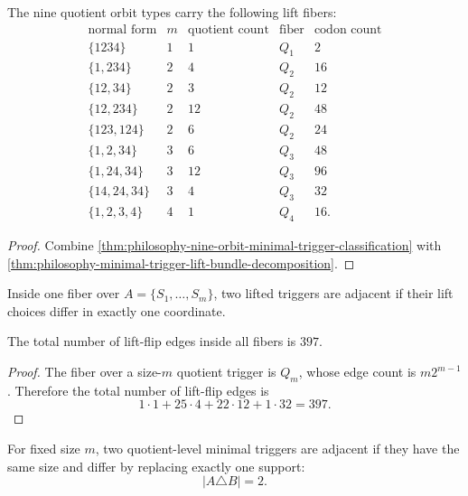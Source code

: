 \begin{corollary}
\label{cor:philosophy-minimal-trigger-orbit-fibers}
The nine quotient orbit types carry the following lift fibers:
$$
\begin{array}{c|r|r|c|r}
  \text{normal form} & m & \text{quotient count} & \text{fiber} & \text{codon count}\\
  \hline
  \{1234\} & 1 & 1 & Q_{1} & 2\\
  \{1,234\} & 2 & 4 & Q_{2} & 16\\
  \{12,34\} & 2 & 3 & Q_{2} & 12\\
  \{12,234\} & 2 & 12 & Q_{2} & 48\\
  \{123,124\} & 2 & 6 & Q_{2} & 24\\
  \{1,2,34\} & 3 & 6 & Q_{3} & 48\\
  \{1,24,34\} & 3 & 12 & Q_{3} & 96\\
  \{14,24,34\} & 3 & 4 & Q_{3} & 32\\
  \{1,2,3,4\} & 4 & 1 & Q_{4} & 16.
\end{array}
$$
\end{corollary}
\begin{proof}
Combine \autoref{thm:philosophy-nine-orbit-minimal-trigger-classification}
with \autoref{thm:philosophy-minimal-trigger-lift-bundle-decomposition}.
\end{proof}

\begin{definition}
\label{def:philosophy-minimal-trigger-lift-flip-graph}
Inside one fiber over $A=\{S_{1},\ldots,S_{m}\}$, two lifted triggers
are adjacent if their lift choices differ in exactly one coordinate.
\end{definition}

\begin{theorem}
\label{thm:philosophy-minimal-trigger-lift-flip-edge-count}
The total number of lift-flip edges inside all fibers is $397$.
\end{theorem}
\begin{proof}
The fiber over a size-$m$ quotient trigger is $Q_{m}$, whose edge count
is $m2^{m-1}$. Therefore the total number of lift-flip edges is
$$
  1\cdot1
  +
  25\cdot4
  +
  22\cdot12
  +
  1\cdot32
  =
  397.
$$
\end{proof}

\begin{definition}
\label{def:philosophy-quotient-support-flip-graph}
For fixed size $m$, two quotient-level minimal triggers are adjacent if
they have the same size and differ by replacing exactly one support:
$$
  |A\triangle B|=2.
$$
\end{definition}

